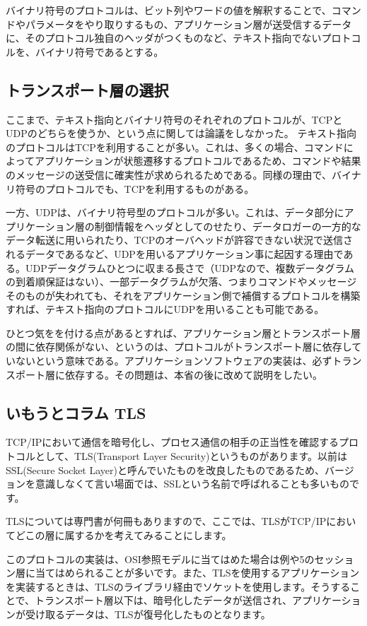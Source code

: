 バイナリ符号のプロトコルは、ビット列やワードの値を解釈することで、コマンドやパラメータをやり取りするもの、アプリケーション層が送受信するデータに、そのプロトコル独自のヘッダがつくものなど、テキスト指向でないプロトコルを、バイナリ符号であるとする。

\subsection{トランスポート層の選択}

ここまで、テキスト指向とバイナリ符号のそれぞれのプロトコルが、TCPとUDPのどちらを使うか、という点に関しては論議をしなかった。
テキスト指向のプロトコルはTCPを利用することが多い。これは、多くの場合、コマンドによってアプリケーションが状態遷移するプロトコルであるため、コマンドや結果のメッセージの送受信に確実性が求められるためである。同様の理由で、バイナリ符号のプロトコルでも、TCPを利用するものがある。

一方、UDPは、バイナリ符号型のプロトコルが多い。これは、データ部分にアプリケーション層の制御情報をヘッダとしてのせたり、データロガーの一方的なデータ転送に用いられたり、TCPのオーバヘッドが許容できない状況で送信されるデータであるなど、UDPを用いるアプリケーション事に起因する理由である。UDPデータグラムひとつに収まる長さで（UDPなので、複数データグラムの到着順保証はない）、一部データグラムが欠落、つまりコマンドやメッセージそのものが失われても、それをアプリケーション側で補償するプロトコルを構築すれば、テキスト指向のプロトコルにUDPを用いることも可能である。

ひとつ気をを付ける点があるとすれば、アプリケーション層とトランスポート層の間に依存関係がない、というのは、プロトコルがトランスポート層に依存していないという意味である。アプリケーションソフトウェアの実装は、必ずトランスポート層に依存する。その問題は、本省の後に改めて説明をしたい。


\subsection*{いもうとコラム TLS}
TCP/IPにおいて通信を暗号化し、プロセス通信の相手の正当性を確認するプロトコルとして、TLS(Transport Layer Security)というものがあります。以前はSSL(Secure Socket Layer)と呼んでいたものを改良したものであるため、バージョンを意識しなくて言い場面では、SSLという名前で呼ばれることも多いものです。

TLSについては専門書が何冊もありますので、ここでは、TLSがTCP/IPにおいてどこの層に属するかを考えてみることにします。

このプロトコルの実装は、OSI参照モデルに当てはめた場合は例や5のセッション層に当てはめられることが多いです。また、TLSを使用するアプリケーションを実装するときは、TLSのライブラリ経由でソケットを使用します。そうすることで、トランスポート層以下は、暗号化したデータが送信され、アプリケーションが受け取るデータは、TLSが復号化したものとなります。

